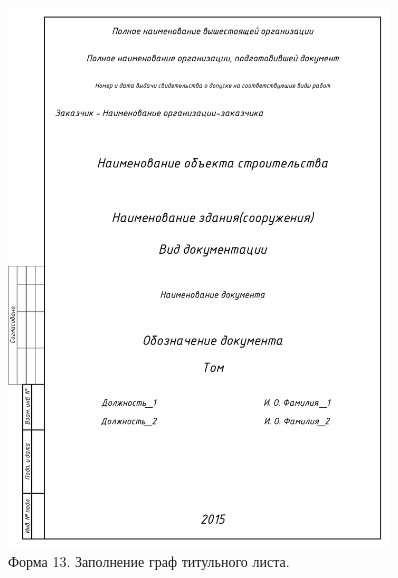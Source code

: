 \documentclass[14pt]{extreport}
\begin{document}
\begin{figure}[h]
	\centering
	\includegraphics[width=0.9\textwidth]{SPDS_TIT_LIST_without_tagname}
    \caption{Форма 13. Заполнение граф титульного листа.\label{SPDS_TIT_LIST_without_tagname}}
\end{figure}
\end{document}
